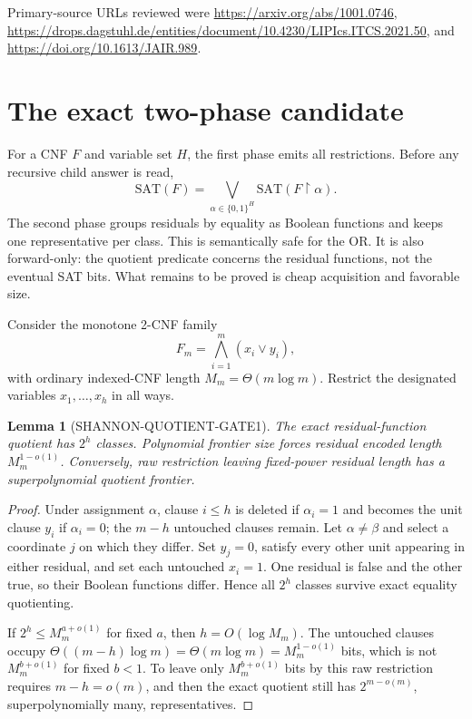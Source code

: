 \documentclass[11pt]{article}
\newtheorem{lemma}{Lemma}
\newcommand{\SAT}{\mathrm{SAT}}
\begin{document}
Primary-source URLs reviewed were
\url{https://arxiv.org/abs/1001.0746},
\url{https://drops.dagstuhl.de/entities/document/10.4230/LIPIcs.ITCS.2021.50},
and \url{https://doi.org/10.1613/JAIR.989}.

\section{The exact two-phase candidate}
For a CNF $F$ and variable set $H$, the first phase emits all restrictions.
Before any recursive child answer is read,
\[
 \SAT(F)=\bigvee_{\alpha\in\{0,1\}^{H}}
 \SAT(F\upharpoonright\alpha).
\]
The second phase groups residuals by equality as Boolean functions and keeps
one representative per class.  This is semantically safe for the OR.  It is
also forward-only: the quotient predicate concerns the residual functions,
not the eventual SAT bits.  What remains to be proved is cheap acquisition
and favorable size.

Consider the monotone 2-CNF family
\[
 F_m=\bigwedge_{i=1}^{m}(x_i\vee y_i),
\]
with ordinary indexed-CNF length $M_m=\Theta(m\log m)$.  Restrict the
designated variables $x_1,\ldots,x_h$ in all ways.

\begin{lemma}[SHANNON-QUOTIENT-GATE1]
The exact residual-function quotient has $2^h$ classes.  Polynomial frontier
size forces residual encoded length $M_m^{1-o(1)}$.  Conversely, raw
restriction leaving fixed-power residual length has a superpolynomial
quotient frontier.
\end{lemma}
\begin{proof}
Under assignment $\alpha$, clause $i\le h$ is deleted if
$\alpha_i=1$ and becomes the unit clause $y_i$ if $\alpha_i=0$; the
$m-h$ untouched clauses remain.  Let $\alpha\ne\beta$ and select a
coordinate $j$ on which they differ.  Set $y_j=0$, satisfy every other unit
appearing in either residual, and set each untouched $x_i=1$.  One residual
is false and the other true, so their Boolean functions differ.  Hence all
$2^h$ classes survive exact equality quotienting.

If $2^h\le M_m^{a+o(1)}$ for fixed $a$, then
$h=O(\log M_m)$.  The untouched clauses occupy
$\Theta((m-h)\log m)=\Theta(m\log m)=M_m^{1-o(1)}$ bits, which is not
$M_m^{b+o(1)}$ for fixed $b<1$.  To leave only $M_m^{b+o(1)}$ bits by this
raw restriction requires $m-h=o(m)$, and then the exact quotient still has
$2^{m-o(m)}$, superpolynomially many, representatives.
\end{proof}
\end{document}
